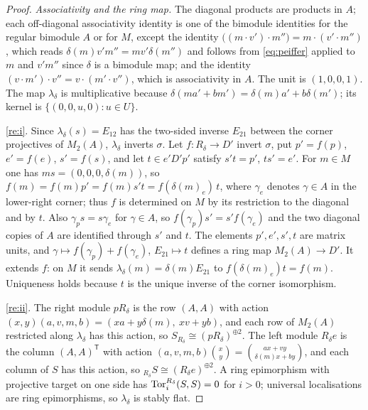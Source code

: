 \begin{proof}
\emph{Associativity and the ring map.}  The diagonal products are products in \(A\); each off-diagonal associativity identity is one of the bimodule identities for the regular bimodule \(A\) or for \(M\), except the identity \(\bigl((m\cdot v')\cdot m''\bigr)=m\cdot(v'\cdot m'')\), which reads \(\delta(m)v'm''=mv'\delta(m'')\) and follows from \eqref{eq:peiffer} applied to \(m\) and \(v'm''\) since \(\delta\) is a bimodule map; and the identity \((v\cdot m')\cdot v''=v\cdot(m'\cdot v'')\), which is associativity in \(A\).  The unit is \((1,0,0,1)\).  The map \(\lambda_\delta\) is multiplicative because \(\delta(ma'+bm')=\delta(m)a'+b\delta(m')\); its kernel is \(\{(0,0,u,0):u\in U\}\).

\ref{re:i}.  Since \(\lambda_\delta(s)=E_{12}\) has the two-sided inverse \(E_{21}\) between the corner projectives of \(M_2(A)\), \(\lambda_\delta\) inverts \(\sigma\).  Let \(f:R_\delta\to D'\) invert \(\sigma\), put \(p'=f(p)\), \(e'=f(e)\), \(s'=f(s)\), and let \(t\in e'D'p'\) satisfy \(s't=p'\), \(ts'=e'\).  For \(m\in M\) one has \(ms=(0,0,0,\delta(m))\), so \(f(m)=f(m)p'=f(m)s't=f(\delta(m)_e)\,t\), where \(\gamma_e\) denotes \(\gamma\in A\) in the lower-right corner; thus \(f\) is determined on \(M\) by its restriction to the diagonal and by \(t\).  Also \(\gamma_ps=s\gamma_e\) for \(\gamma\in A\), so \(f(\gamma_p)s'=s'f(\gamma_e)\) and the two diagonal copies of \(A\) are identified through \(s'\) and \(t\).  The elements \(p',e',s',t\) are matrix units, and \(\gamma\mapsto f(\gamma_p)+f(\gamma_e)\), \(E_{21}\mapsto t\) defines a ring map \(M_2(A)\to D'\).  It extends \(f\): on \(M\) it sends \(\lambda_\delta(m)=\delta(m)E_{21}\) to \(f(\delta(m)_e)t=f(m)\).  Uniqueness holds because \(t\) is the unique inverse of the corner isomorphism.

\ref{re:ii}.  The right module \(pR_\delta\) is the row \((A,A)\) with action \((x,y)(a,v,m,b)=(xa+y\delta(m),\ xv+yb)\), and each row of \(M_2(A)\) restricted along \(\lambda_\delta\) has this action, so \(S_{R_\delta}\cong(pR_\delta)^{\oplus2}\).  The left module \(R_\delta e\) is the column \((A,A)^{\mathsf T}\) with action \((a,v,m,b)\binom xy=\binom{ax+vy}{\delta(m)x+by}\), and each column of \(S\) has this action, so \({}_{R_\delta}S\cong(R_\delta e)^{\oplus2}\).  A ring epimorphism with projective target on one side has \(\operatorname{Tor}^{R_\delta}_i(S,S)=0\) for \(i>0\); universal localisations are ring epimorphisms, so \(\lambda_\delta\) is stably flat.


\end{proof}
